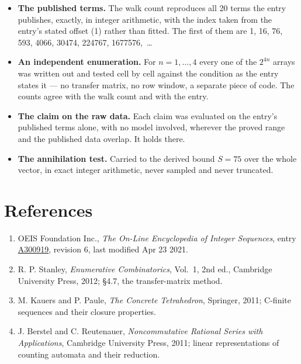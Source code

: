 \documentclass[11pt]{article}
\theoremstyle{definition}
\begin{document}
\begin{itemize}

\item {\bfseries The published terms.} The walk count reproduces all 20 terms the entry publishes, exactly, in integer arithmetic, with the index taken from the entry's stated offset (1) rather than fitted. The first of them are 1, 16, 76, 593, 4066, 30474, 224767, 1677576,~\dots

\item {\bfseries An independent enumeration.} For $n = 1,\dots,4$ every one of the $2^{4n}$ arrays was written out and tested cell by cell against the condition as the entry states it --- no transfer matrix, no row window, a separate piece of code. The counts agree with the walk count and with the entry.

\item {\bfseries The claim on the raw data.} Each claim was evaluated on the entry's published terms alone, with no model involved, wherever the proved range and the published data overlap. It holds there.

\item {\bfseries The annihilation test.} Carried to the derived bound $S = 75$ over the whole vector, in exact integer arithmetic, never sampled and never truncated.

\end{itemize}

\section{References}

\begin{enumerate}

\item OEIS Foundation Inc., \emph{The On-Line Encyclopedia of Integer Sequences}, entry \href{https://oeis.org/A300919}{A300919}, revision 6, last modified Apr 23 2021.

\item R. P. Stanley, \emph{Enumerative Combinatorics}, Vol.~1, 2nd ed., Cambridge University Press, 2012; \S4.7, the transfer-matrix method.

\item M. Kauers and P. Paule, \emph{The Concrete Tetrahedron}, Springer, 2011; C-finite sequences and their closure properties.

\item J. Berstel and C. Reutenauer, \emph{Noncommutative Rational Series with Applications}, Cambridge University Press, 2011; linear representations of counting automata and their reduction.

\end{enumerate}
\end{document}
